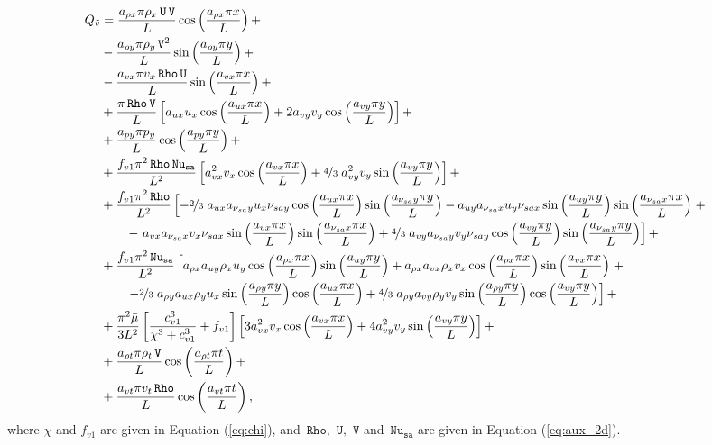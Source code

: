 \documentclass[10pt]{article}
\newcommand{\Rho}{\,\mathtt{Rho}}
\newcommand{\U}{\,\mathtt{U}}
\newcommand{\V}{\,\mathtt{V}}
\newcommand{\Nu}{\,\mathtt{Nu_{sa}}}
\newcommand{\tv}{\tilde{v}}
\newcommand{\bmu}{\bar{\mu}}
\begin{document}
\begin{equation}
 \begin{split}
Q_{\tv} &= \dfrac{a_{\rho x} \pi \rho_x \U \V  }{L}\cos\left(\dfrac{a_{\rho x} \pi x}{L}\right)+ \\
&-\dfrac{a_{\rho y} \pi \rho_y \V^2 }{L} \sin\left(\dfrac{a_{\rho y} \pi y}{L}\right)+ \\
&-\dfrac{a_{vx} \pi v_x \Rho \U  }{L}\sin\left(\dfrac{a_{vx} \pi x}{L}\right)+ \\
&+\dfrac{ \pi \Rho \V}{L}\left[a_{ux} u_x  \cos\left(\dfrac{a_{ux} \pi x}{L}\right)+2 a_{vy} v_y  \cos\left(\dfrac{a_{vy} \pi y}{L}\right)\right]+ \\
&+\dfrac{a_{py} \pi p_y  }{L}\cos\left(\dfrac{a_{py} \pi y}{L}\right)+ \\
&+\dfrac{f_{v1} \pi^2 \Rho \Nu}{L^2}\left[a_{vx}^2 v_x  \cos\left(\dfrac{a_{vx} \pi x}{L}\right)+\nicefrac{4}{3} \; a_{vy}^2 v_y  \sin\left(\dfrac{a_{vy} \pi y}{L}\right)\right] + \\
&+\dfrac{f_{v1} \pi^2 \Rho}{L^2}\left[-\nicefrac{2}{3} \; a_{ux} a_{\nu_{sa} y} u_x \nu_{sa y}  \cos\left(\dfrac{a_{ux} \pi x}{L}\right)  \sin\left(\dfrac{a_{\nu_{sa} y} \pi y}{L}\right)- a_{uy} a_{\nu_{sa} x} u_y \nu_{sa x} \sin\left(\dfrac{a_{uy} \pi y}{L}\right)  \sin\left(\dfrac{a_{\nu_{sa} x} \pi x}{L}\right)\right.+\\
    &\qquad -\left. a_{vx} a_{\nu_{sa} x} v_x \nu_{sa x} \sin\left(\dfrac{a_{vx} \pi x}{L}\right)  \sin\left(\dfrac{a_{\nu_{sa} x} \pi x}{L}\right)+\nicefrac{4}{3} \;  a_{vy} a_{\nu_{sa} y} v_y \nu_{sa y} \cos\left(\dfrac{a_{vy} \pi y}{L}\right)  \sin\left(\dfrac{a_{\nu_{sa} y} \pi y}{L}\right)\right] + \\
&+\dfrac{f_{v1} \pi^2 \Nu }{L^2}\left[a_{\rho x} a_{uy} \rho_x u_y  \cos\left(\dfrac{a_{\rho x} \pi x}{L}\right)  \sin\left(\dfrac{a_{uy} \pi y}{L}\right)+a_{\rho x} a_{vx} \rho_x v_x  \cos\left(\dfrac{a_{\rho x} \pi x}{L}\right)  \sin\left(\dfrac{a_{vx} \pi x}{L}\right)\right.+\\
    &\qquad\left. -\nicefrac{2}{3} \; a_{\rho y} a_{ux} \rho_y u_x  \sin\left(\dfrac{a_{\rho y} \pi y}{L}\right)  \cos\left(\dfrac{a_{ux} \pi x}{L}\right)+\nicefrac{4}{3} \; a_{\rho y} a_{vy} \rho_y v_y  \sin\left(\dfrac{a_{\rho y} \pi y}{L}\right)  \cos\left(\dfrac{a_{vy} \pi y}{L}\right)\right] + \\
&+ \dfrac{\pi^2 \bmu}{3L^2}\left[\dfrac{c_{v1}^3 }{ \chi^3+c_{v1}^3} +f_{v1}\right]\left[3 a_{vx}^2 v_x  \cos\left(\dfrac{a_{vx} \pi x}{L}\right)+4 a_{vy}^2 v_y  \sin\left(\dfrac{a_{vy} \pi y}{L}\right)\right] +\\
&+\dfrac{a_{\rho t} \pi \rho_t \V}{L}  \cos\left(\dfrac{a_{\rho t} \pi t}{L}\right)+ \\
&+\dfrac{a_{vt} \pi v_t \Rho }{L} \cos\left(\dfrac{a_{vt} \pi t}{L}\right),
 \end{split}
\end{equation}
where $\chi$ and $f_{v1}$ are given in  Equation (\ref{eq:chi}), and  $\Rho,\,\U,\,\V$ and $\Nu$ are given in Equation (\ref{eq:aux_2d}).
\end{document}
